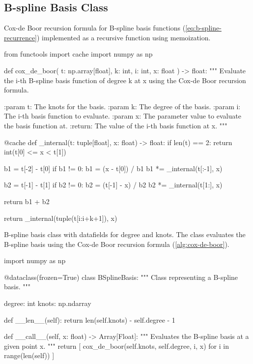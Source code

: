\subsection{B-spline Basis Class}

\begin{algorithm}
    \caption{Cox-de Boor recursion formula for B-spline basis functions (\cref{eq:b-spline-recurrence}) implemented as a recursive function using memoization.}
    \label{alg:cox-de-boor}
    \begin{python}
    from functools import cache
    import numpy as np
    
    def cox_de_boor(
        t: np.array[float], k: int, i: int, x: float
    ) -> float:
        """
        Evaluate the i-th B-spline basis function of degree k at x
        using the Cox-de Boor recursion formula.
    
        :param t: The knots for the basis.
        :param k: The degree of the basis.
        :param i: The i-th basis function to evaluate.
        :param x: The parameter value to evaluate the basis function at.
        :return: The value of the i-th basis function at x.
        """
    
        @cache
        def _internal(t: tuple[float], x: float) -> float:
            if len(t) == 2:
                return int(t[0] <= x < t[1])
    
            b1 = t[-2] - t[0]
            if b1 != 0:
                b1 = (x - t[0]) / b1
                b1 *= _internal(t[:-1], x)
    
            b2 = t[-1] - t[1]
            if b2 != 0:
                b2 = (t[-1] - x) / b2
                b2 *= _internal(t[1:], x)
    
            return b1 + b2
    
        return _internal(tuple(t[i:i+k+1]), x)    
    
    \end{python}
    \end{algorithm}




\begin{algorithm}
\caption{B-spline basis class with datafields for degree and knots. The class evaluates the B-spline basis using the Cox-de Boor recursion formula (\cref{alg:cox-de-boor}).}
\label{alg:b-spline-class}
\begin{python}
import numpy as np

@dataclass(frozen=True)
class BSplineBasis:
    """
    Class representing a B-spline basis.
    """

    degree: int
    knots: np.ndarray

    def __len__(self):
        return len(self.knots) - self.degree - 1

    def __call__(self, x: float) -> Array[Float]:
        """
        Evaluates the B-spline basis at a given point x.
        """
        return [
            cox_de_boor(self.knots, self.degree, i, x)
            for i in range(len(self))
        ]

\end{python}
\end{algorithm}

